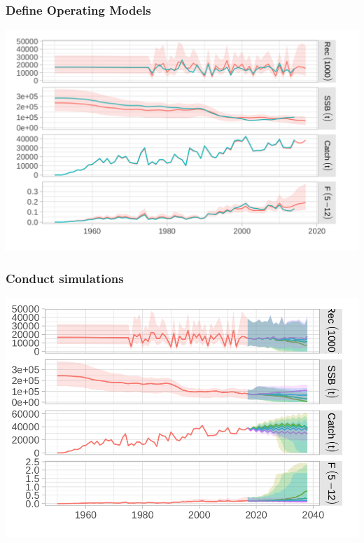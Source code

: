 \documentclass{beamer}\usepackage[]{graphicx}\usepackage[]{xcolor}
\begin{document}
\begin{frame}
\frametitle{Define Operating Models}

\begin{center}
\includegraphics[height=0.95\textheight]{figs/om.png}
\end{center}

\end{frame}

\begin{frame}
\frametitle{Conduct simulations}

\begin{center}
\includegraphics[height=0.95\textheight]{figs/runs.png}
\end{center}

\end{frame}
\end{document}
